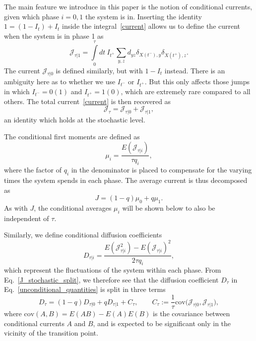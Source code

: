 \documentclass[aps,pre,reprint, amsmath, amssymb,superscriptaddress]{revtex4-1}
\newcommand{\CEF}[1]{\textcolor{blue}{[CEF: #1}]}
\newcommand{\Cov}{\text{cov}}
\begin{document}
The main feature we introduce in this paper is the notion of conditional currents, given which phase $i = 0,1$ the system is in. 
Inserting the identity $1 = (1-I_t) + I_t$ inside the integral~\eqref{current} allows us to define the current when the system is in phase 1 as 
\begin{equation}\label{J_stoch_1}
    \mathcal{J}_{\tau|1} = 
    \int\limits_0^\tau dt~I_{t^+} \sum\limits_{y,z} d_{yz}  \delta_{X(t^-),y} \delta_{X(t^+),z}.
\end{equation}
The current $\mathcal{J}_{\tau|0}$ is defined similarly, but with $1-I_t$ instead. 
There is an ambiguity here as to whether we use $I_{t^-}$ or $I_{t^+}$. 
But this only affects those jumps in which $I_{t^-} = 0(1)$ and $I_{t^+} = 1(0)$, which are extremely rare compared to all others. 
The total current~\eqref{current} is then recovered as
\begin{equation}\label{J_stochastic_split}
    \mathcal{J}_\tau =  \mathcal{J}_{\tau|0} +  \mathcal{J}_{\tau | 1}, 
\end{equation}
an identity which holds  at the stochastic level.

The conditional first moments are  defined as 
\begin{equation}\label{mu_i}
    \mu_i = \frac{E(\mathcal{J}_{\tau|i})}{\tau q_i},
\end{equation}
where the factor of $q_i$ in the denominator is placed to compensate for the varying times the system spends in each phase. The average current is thus decomposed as
\begin{equation}\label{aver}
    J = (1-q) \mu_0 + q \mu_1. 
\end{equation}
As with $J$, the conditional averages $\mu_i$ will be shown below to also be independent of $\tau$.

Similarly, we define conditional diffusion coefficients
\begin{equation}\label{D_i}
    D_{\tau|i} =  \frac{E(\mathcal{J}_{\tau|i}^2) - E(\mathcal{J}_{\tau|i})^2}{2\tau q_i},
\end{equation}
which represent the fluctuations of the system within each phase.
From Eq.~\eqref{J_stochastic_split}, we therefore see that the diffusion coefficient $D_\tau$ in Eq.~\eqref{unconditional_quantities} is split in three terms
\begin{equation}\label{diffusion_cond_uncond_relation}
    D_\tau = (1-q)D_{\tau|0} + q D_{\tau|1} + C_\tau, 
    \qquad C_\tau := \frac{1}{\tau} \Cov\big(\mathcal{J}_{\tau|0}, \mathcal{J}_{\tau|1}\big),
\end{equation}
where $\Cov(A,B) = E(AB) - E(A)E(B)$ is the covariance
between conditional currents $A$ and $B$, and is expected to be significant only in the vicinity of the transition point. 
\end{document}
